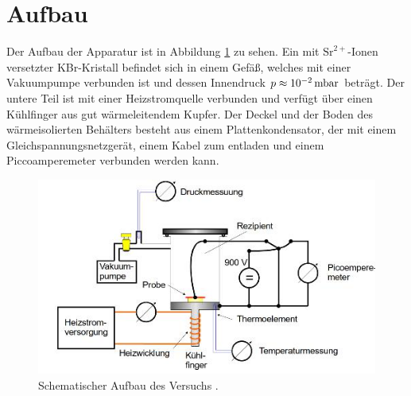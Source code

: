 \section{Aufbau}
\label{sec:Aufbau}

Der Aufbau der Apparatur ist in Abbildung \ref{fig:Aufbau} zu sehen.
Ein mit $\mathrm{Sr}^{2+}$-Ionen versetzter KBr-Kristall befindet sich in einem Gefäß, welches mit einer Vakuumpumpe verbunden ist und dessen Innendruck $p\approx\SI{E-2}{\milli\bar}$ beträgt. Der untere Teil ist mit einer Heizstromquelle verbunden und verfügt über einen Kühlfinger aus gut wärmeleitendem Kupfer.
Der Deckel und der Boden des wärmeisolierten Behälters besteht aus einem Plattenkondensator, der mit einem Gleichspannungsnetzgerät, einem Kabel zum entladen und einem Piccoamperemeter verbunden werden kann.

\begin{figure}
	\centering
	\includegraphics[width=\linewidth-70pt,height=\textheight-70pt,keepaspectratio]{content/images/Aufbau.jpg}
	\caption{Schematischer Aufbau des Versuchs \cite{V48}.}
	\label{fig:Aufbau}
\end{figure}
